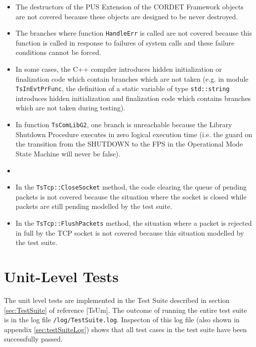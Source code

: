 \documentclass{pnp_article}
\begin{document}
{\begin{itemize}
\item The destructors of the PUS Extension of the CORDET Framework objects are not covered because these objects are designed to be never destroyed.
\item The branches where function \texttt{HandleErr} is called are not covered because this function is called in response to failures of system calls and these failure conditions cannot be forced.
\item In some cases, the C++ compiler introduces hidden initialization or finalization code which contain branches which are not taken (e.g. in module \texttt{TsInEvtPrFunc}, the definition of a static variable of type \texttt{std::string} introduces hidden initialization and finalization code which contains branches which are not taken during testing).
\item In function \texttt{TsComLibG2}, one branch is unreachable because the Library Shutdown Procedure executes in zero logical execution time (i.e. the guard on the transition from the SHUTDOWN to the FPS in the Operational Mode State Machine will never be false).
\item {}
\item In the \texttt{TsTcp::CloseSocket} method, the code clearing the queue of pending packets is not covered because the situation where the socket is closed while packets are still pending  modelled by the test suite.
\item In the \texttt{TsTcp::FlushPackets} method, the situation where a packet is rejected in full by the TCP socket is not covered because this situation   modelled by the test suite.
\end{itemize} 




\begin{landscape}
\end{landscape}


}

\section{Unit-Level Tests}\label{sec:svrUnitLeveTests}
The unit level tests are implemented in the Test Suite described in section \ref{sec:TestSuite} of reference [TsUm]. The outcome of running the entire test suite is in the log file \texttt{/log/TestSuite.log}. Inspecton of this log file (also shown in appendix \ref{sec:testSuiteLog}) shows that all test cases in the test suite have been successfully passed.
\end{document}
